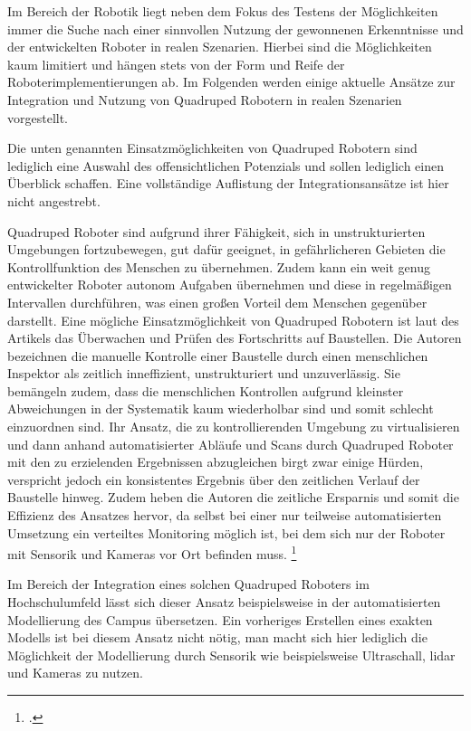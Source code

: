 Im Bereich der Robotik liegt neben dem Fokus des Testens der Möglichkeiten immer die Suche nach einer sinnvollen Nutzung
der gewonnenen Erkenntnisse und der entwickelten Roboter in realen Szenarien.
Hierbei sind die Möglichkeiten kaum limitiert und hängen stets von der Form und Reife der Roboterimplementierungen ab.
Im Folgenden werden einige aktuelle Ansätze zur Integration und Nutzung von Quadruped Robotern in realen Szenarien vorgestellt.

Die unten genannten Einsatzmöglichkeiten von Quadruped Robotern sind lediglich eine Auswahl des offensichtlichen
Potenzials und sollen lediglich einen Überblick schaffen.
Eine vollständige Auflistung der Integrationsansätze ist hier nicht angestrebt.

Quadruped Roboter sind aufgrund ihrer Fähigkeit, sich in unstrukturierten Umgebungen fortzubewegen, gut dafür geeignet,
in gefährlicheren Gebieten die Kontrollfunktion des Menschen zu übernehmen.
Zudem kann ein weit genug entwickelter Roboter autonom Aufgaben übernehmen und diese in regelmäßigen Intervallen durchführen,
was einen großen Vorteil dem Menschen gegenüber darstellt.
Eine mögliche Einsatzmöglichkeit von Quadruped Robotern ist laut des Artikels  das Überwachen und
Prüfen des Fortschritts auf Baustellen.
Die Autoren bezeichnen die manuelle Kontrolle einer Baustelle durch einen menschlichen Inspektor als zeitlich inneffizient,
unstrukturiert und unzuverlässig.
Sie bemängeln zudem, dass die menschlichen Kontrollen aufgrund kleinster Abweichungen in der Systematik kaum wiederholbar sind
und somit schlecht einzuordnen sind.
Ihr Ansatz, die zu kontrollierenden Umgebung zu virtualisieren und dann anhand automatisierter Abläufe und Scans durch
Quadruped Roboter mit den zu erzielenden Ergebnissen abzugleichen birgt zwar einige Hürden, verspricht jedoch
ein konsistentes Ergebnis über den zeitlichen Verlauf der Baustelle hinweg.
Zudem heben die Autoren die zeitliche Ersparnis und somit die Effizienz des Ansatzes hervor, da selbst bei einer nur teilweise
automatisierten Umsetzung ein verteiltes Monitoring möglich ist, bei dem sich nur der Roboter mit Sensorik und Kameras vor Ort befinden muss.
\footcite{construction_quadruped}

Im Bereich der Integration eines solchen Quadruped Roboters im Hochschulumfeld lässt sich dieser Ansatz beispielsweise
in der automatisierten Modellierung des Campus übersetzen.
Ein vorheriges Erstellen eines exakten Modells ist bei diesem Ansatz nicht nötig, man macht sich hier lediglich die
Möglichkeit der Modellierung durch Sensorik wie beispielsweise Ultraschall, \gls{lidar} und Kameras zu nutzen.


